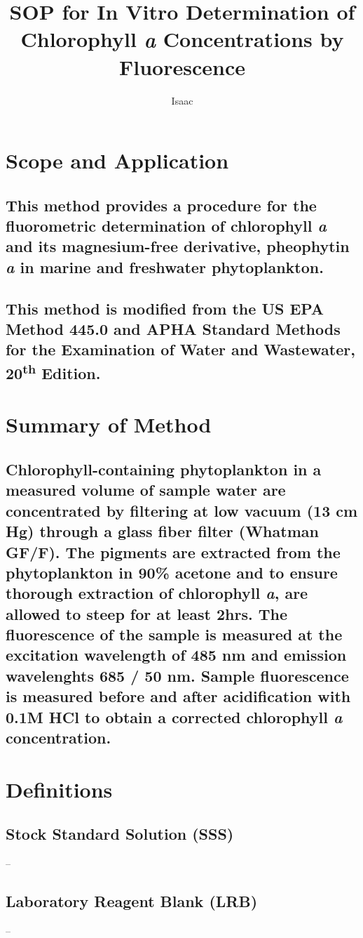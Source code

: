 \documentclass{article}
\author{Isaac}
\title{SOP for In Vitro Determination of Chlorophyll \textit{a} Concentrations by Fluorescence}
\begin{document}

\maketitle
\section{Scope and Application}
  \subsection{This method provides a procedure for the fluorometric determination of chlorophyll \textit{a} and its magnesium-free derivative, pheophytin \textit{a} in marine and freshwater phytoplankton.}
  \subsection{This method is modified from the US EPA Method 445.0 and APHA Standard Methods for the Examination of Water and Wastewater, 20\textsuperscript{th} Edition.} 
\section{Summary of Method}
  \subsection{Chlorophyll-containing phytoplankton in a measured volume of sample water are concentrated by filtering at low vacuum (13 cm Hg) through a glass fiber filter (Whatman GF/F). The pigments are extracted from the phytoplankton in 90\% acetone and to ensure thorough extraction of chlorophyll \textit{a}, are allowed to steep for at least 2hrs. The fluorescence of the sample is measured at the excitation wavelength of 485 nm and emission wavelenghts 685 / 50 nm. Sample fluorescence is measured before and after acidification with 0.1M HCl to obtain a corrected chlorophyll \textit{a} concentration.} 
\section{Definitions}
\subsection{\textbf{Stock Standard Solution (SSS)}} --
\subsection{\textbf{Laboratory Reagent Blank (LRB)}} --
\end{document}
